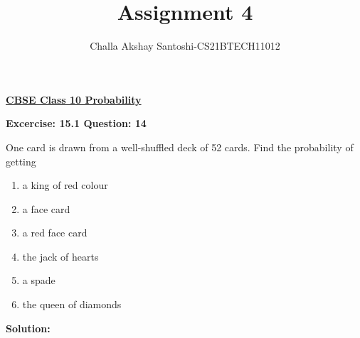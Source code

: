 \documentclass[journal,12pt,twocolumn]{IEEEtran}
\begin{document}
\newcommand{\myvec}[1]{\ensuremath{\begin{pmatrix}#1\end{pmatrix}}}
\newcommand{\mydet}[1]{\ensuremath{\begin{vmatrix}#1\end{vmatrix}}}
\makeatletter
{}
\makeatother
\let\StandardTheFigure\thefigure
\let\vec\mathbf
\renewcommand{\thefigure}{\theproblem}
\def\putbox#1#2#3{\makebox[0in][l]{\makebox[#1][l]{}\raisebox{\baselineskip}[0in][0in]{\raisebox{#2}[0in][0in]{#3}}}}
     \def\rightbox#1{\makebox[0in][r]{#1}}
     \def\centbox#1{\makebox[0in]{#1}}
     \def\topbox#1{\raisebox{-\baselineskip}[0in][0in]{#1}}
     \def\midbox#1{\raisebox{-0.5\baselineskip}[0in][0in]{#1}}
\vspace{3cm}
\title{Assignment 4}
\author{Challa Akshay Santoshi-CS21BTECH11012}
\maketitle
\newpage
\bigskip
\renewcommand{\thefigure}{\theenumi}
\renewcommand{\thetable}{\theenumi}
\begin{center}
  \textbf{\underline{CBSE Class 10 Probability}}\\
\end{center}
\begin{center}
  \textbf{Excercise: 15.1 Question: 14}  
\end{center}
One card is drawn from a well-shuffled deck of 52 cards. Find the probability of getting
\begin{enumerate}
	\item a king of red colour
	\item a face card
	\item a red face card
	\item the jack of hearts
	\item a spade
	\item the queen of diamonds
\end{enumerate}
\begin{center}
  \textbf{Solution:}  
\end{center}
\end{document}
